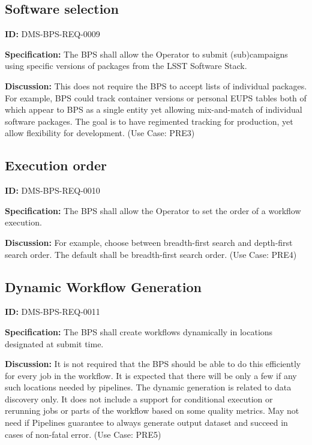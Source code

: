 \documentclass[SE,toc,lsstdraft]{lsstdoc}
\begin{document}
\subsection{Software selection}

\label{DMS-BPS-REQ-0009}
\textbf{ID:} DMS-BPS-REQ-0009

\textbf{Specification:}
The BPS shall allow the Operator to submit (sub)campaigns using specific versions of packages from the LSST Software Stack.

\textbf{Discussion:}
This does not require the BPS to accept lists of individual packages. For example, BPS could track container versions or personal EUPS tables both of which appear to BPS as a single entity yet allowing mix-and-match of individual software packages. The goal is to have regimented tracking for production, yet allow flexibility for development.  (Use Case: PRE3)

\subsection{Execution order}

\label{DMS-BPS-REQ-0010}
\textbf{ID:} DMS-BPS-REQ-0010

\textbf{Specification:}
The BPS shall allow the Operator to set the order of a workflow execution.

\textbf{Discussion:}
For example, choose between breadth-first search and depth-first search order. The default shall be breadth-first search order.  (Use Case: PRE4)

\subsection{Dynamic Workflow Generation}

\label{DMS-BPS-REQ-0011}
\textbf{ID:} DMS-BPS-REQ-0011

\textbf{Specification:}
The BPS shall create workflows dynamically in locations designated at submit time.

\textbf{Discussion:}
It is not required that the BPS should be able to do this efficiently for every job in the workflow. It is expected that there will be only a few if any such locations needed by pipelines. The dynamic generation is related to data discovery only. It does not include a support for conditional execution or rerunning jobs or parts of the workflow based on some quality metrics.  May not need if Pipelines guarantee to always generate output dataset and succeed in cases of non-fatal error.  (Use Case: PRE5)
\end{document}

